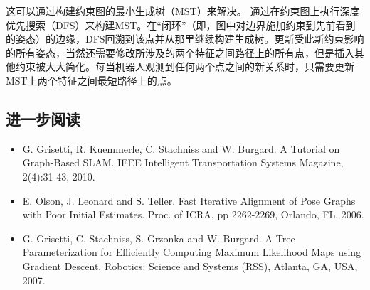 这可以通过构建约束图的最小生成树（MST）来解决。 通过在约束图上执行深度优先搜索（DFS）来构建MST。在“闭环”（即，图中对边界施加约束到先前看到的姿态）的边缘，DFS回溯到该点并从那里继续构建生成树。更新受此新约束影响的所有姿态，当然还需要修改所涉及的两个特征之间路径上的所有点，但是插入其他约束被大大简化。每当机器人观测到任何两个点之间的新关系时，只需要更新MST上两个特征之间最短路径上的点。

\subsection*{进一步阅读}
\begin{itemize}
\item G. Grisetti, R. Kuemmerle, C. Stachniss and W. Burgard. A Tutorial on Graph-Based SLAM. IEEE Intelligent Transportation Systems Magazine, 2(4):31-43, 2010.

\item E. Olson, J. Leonard and S. Teller. Fast Iterative Alignment of Pose Graphs with Poor Initial Estimates. Proc. of ICRA, pp 2262-2269, Orlando, FL, 2006.

\item G. Grisetti, C. Stachniss, S. Grzonka and W. Burgard. A Tree Parameterization for Efficiently Computing Maximum Likelihood Maps using Gradient Descent. Robotics: Science and Systems (RSS), Atlanta, GA, USA, 2007.
\end{itemize}
